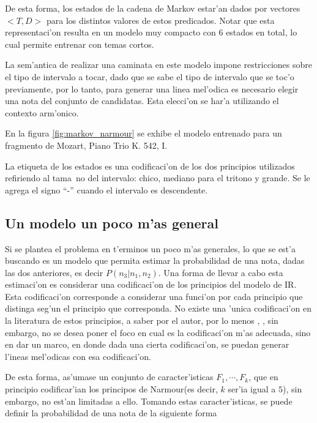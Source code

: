 De esta forma, los estados de la cadena de Markov estar'an dados por vectores $<T, D>$ para los distintos valores de estos predicados. Notar que esta representaci'on
resulta en un modelo muy compacto con $6$ estados en total, lo cual permite entrenar con temas cortos.

La sem'antica de realizar una caminata en este modelo impone restricciones sobre el tipo de intervalo a tocar, dado que se sabe el tipo de intervalo que se 
toc'o previamente, por lo tanto, para generar una linea mel'odica es necesario elegir una nota del conjunto de candidatas. Esta elecci'on se har'a utilizando el contexto
arm'onico.

En la figura \ref{fig:markov_narmour} se exhibe el modelo entrenado para un fragmento de Mozart, Piano Trio K. 542, I.

La etiqueta de los estados es una codificaci'on de los dos principios utilizados refiriendo al tama~no del intervalo: chico, mediano para el tritono y grande. Se 
le agrega el signo ``-'' cuando el intervalo es descendente.


\begin{imagen}
    \width{12cm}
\end{imagen}

\subsection{Un modelo un poco m'as general}
Si se plantea el problema en t'erminos un poco m'as generales, lo que se est'a buscando es un modelo que permita estimar la probabilidad de una nota, 
dadas las dos anteriores, es decir $P(n_3|n_1, n_2)$. Una forma de llevar a cabo esta estimaci'on es considerar una codificaci'on de los principios del modelo de IR.
Esta codificaci'on corresponde a considerar una funci'on por cada principio que distinga seg'un el principio que corresponda. No existe una 'unica codificaci'on
en la literatura de estos principios, a saber por el autor, por lo menos  \cite{PaieThesis}, \cite{Schellenberg97}, sin embargo, no se desea poner el foco en cual es 
la codificaci'on m'as adecuada, sino en dar un marco, en donde dada una cierta codificaci'on, se puedan generar l'ineas mel'odicas con esa codificaci'on.

De esta forma, as'umase un conjunto de caracter'isticas $F_1, \cdots, F_k$, que en principio codificar'ian los principos de Narmour(es decir, $k$ ser'ia igual a $5$), 
sin embargo, no est'an limitadas a ello. Tomando estas caracter'isticas, se puede definir la probabilidad de una nota de la siguiente forma


